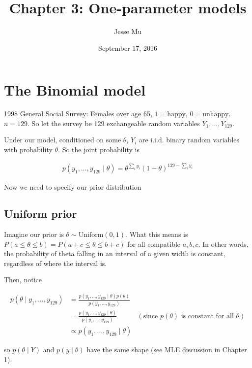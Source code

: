 \documentclass[]{article}
\title{Chapter 3: One-parameter models}
\author{Jesse Mu}
\date{September 17, 2016}
\begin{document}
\maketitle

{
\setcounter{tocdepth}{2}
\tableofcontents
}
\hypertarget{the-binomial-model}{%
\section{The Binomial model}\label{the-binomial-model}}

1998 General Social Survey: Females over age 65, \(1 = \text{happy}\),
\(0 = \text{unhappy}\). \(n = 129\). So let the survey be 129
exchangeable random variables \(Y_1, \dots, Y_{129}\).

Under our model, conditioned on some \(\theta\), \(Y_i\) are i.i.d.
binary random variables with probability \(\theta\). So the joint
probability is

\begin{align}
p(y_1, \dots, y_{129} \mid \theta) = \theta^{\sum_{i} y_i} (1 - \theta)^{129 -
\sum_i y_i}
\end{align}

Now we need to specify our prior distribution

\hypertarget{uniform-prior}{%
\subsection{Uniform prior}\label{uniform-prior}}

Imagine our prior is \(\theta \sim \text{Uniform}(0, 1)\). What this
means is \(P(a \leq \theta \leq b) = P(a + c \leq \theta \leq b + c)\)
for all compatible \(a, b, c\). In other words, the probability of theta
falling in an interval of a given width is constant, regardless of where
the interval is.

Then, notice

\begin{align}
p(\theta \mid y_1, \dots, y_{129}) &= \frac{p(y_1, \dots, y_{129} \mid \theta) p(\theta)}{p(y_1, \dots, y_{129})} \\
&= \frac{p(y_1, \dots, y_{129} \mid \theta)}{p(y_1, \dots, y_{129})} & (\text{since $p(\theta)$ is constant for all $\theta$}) \\
&\propto p(y_1, \dots, y_{129} \mid \theta)
\end{align}

so \(p(\theta \mid Y)\) and \(p(y \mid \theta)\) have the same shape
(see MLE discussion in Chapter 1).
\end{document}
